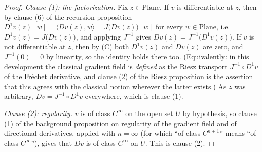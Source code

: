 \begin{proof}
\medskip\noindent\emph{Clause (1): the factorization.}
Fix $z\in\mathrm{Plane}$.  If $v$ is differentiable at $z$, then by clause (6) of the recursion
proposition $D^{1}v(z)[w]=\langle Dv(z),w\rangle=J\bigl(Dv(z)\bigr)[w]$ for every
$w\in\mathrm{Plane}$, i.e.\ $D^{1}v(z)=J\bigl(Dv(z)\bigr)$, and applying $J^{-1}$ gives
$Dv(z)=J^{-1}\bigl(D^{1}v(z)\bigr)$.  If $v$ is not differentiable at $z$, then by (C) both
$D^{1}v(z)$ and $Dv(z)$ are zero, and $J^{-1}(0)=0$ by linearity, so the identity holds there
too.  (Equivalently: in this development the classical gradient field is \emph{defined} as the
Riesz transport $J^{-1}\circ D^{1}v$ of the Fr\'echet derivative, and clause (2) of the Riesz
proposition is the assertion that this agrees with the classical notion wherever the latter
exists.)  As $z$ was arbitrary, $Dv=J^{-1}\circ D^{1}v$ everywhere, which is clause (1).

\medskip\noindent\emph{Clause (2): regularity.}
$v$ is of class $C^{\infty}$ on the open set $U$ by hypothesis, so clause (1) of the background
proposition on regularity of the gradient field and of directional derivatives, applied with
$n=\infty$ (for which ``of class $C^{n+1}$'' means ``of class $C^{\infty}$''), gives that $Dv$ is
of class $C^{\infty}$ on $U$.  This is clause (2).


\end{proof}
